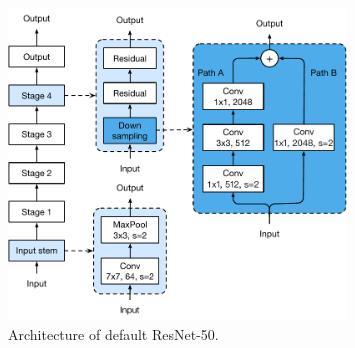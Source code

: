 \begin{figure}[h!]
    \centering
    \includegraphics[width=0.8\textwidth]{images/resnet-a.pdf}
    \caption{Architecture of default ResNet-50.}
    \label{fig:resnet-a_2}
  \end{figure}










